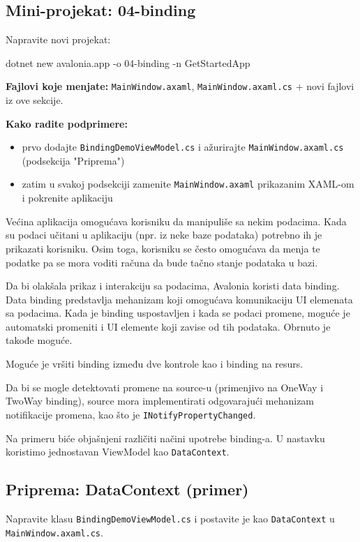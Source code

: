 \documentclass[11pt,a4paper]{article}
\begin{document}
\subsection*{Mini-projekat: 04-binding}
Napravite novi projekat:

\begin{CodeBlock}
dotnet new avalonia.app -o 04-binding -n GetStartedApp
\end{CodeBlock}

\textbf{Fajlovi koje menjate:} \texttt{MainWindow.axaml}, \texttt{MainWindow.axaml.cs} + novi fajlovi iz ove sekcije.

\textbf{Kako radite podprimere:}
\begin{itemize}[leftmargin=*]
  \item prvo dodajte \texttt{BindingDemoViewModel.cs} i ažurirajte \texttt{MainWindow.axaml.cs} (podsekcija "Priprema")
  \item zatim u svakoj podsekciji zamenite \texttt{MainWindow.axaml} prikazanim XAML-om i pokrenite aplikaciju
\end{itemize}

Većina aplikacija omogućava korisniku da manipuliše sa nekim podacima. Kada su podaci učitani u aplikaciju (npr. iz neke baze podataka) potrebno ih je prikazati korisniku. Osim toga, korisniku se često omogućava da menja te podatke pa se mora voditi računa da bude tačno stanje podataka u bazi.

Da bi olakšala prikaz i interakciju sa podacima, Avalonia koristi data binding. Data binding predstavlja mehanizam koji omogućava komunikaciju UI elemenata sa podacima. Kada je binding uspostavljen i kada se podaci promene, moguće je automatski promeniti i UI elemente koji zavise od tih podataka. Obrnuto je takođe moguće.

Moguće je vršiti binding između dve kontrole kao i binding na resurs.

Da bi se mogle detektovati promene na source-u (primenjivo na OneWay i TwoWay binding), source mora implementirati odgovarajući mehanizam notifikacije promena, kao što je \texttt{INotifyPropertyChanged}.

Na primeru biće objašnjeni različiti načini upotrebe binding-a. U nastavku koristimo jednostavan ViewModel kao \texttt{DataContext}.

\subsection{Priprema: DataContext (primer)}
Napravite klasu \texttt{BindingDemoViewModel.cs} i postavite je kao \texttt{DataContext} u \texttt{MainWindow.axaml.cs}.
\end{document}

